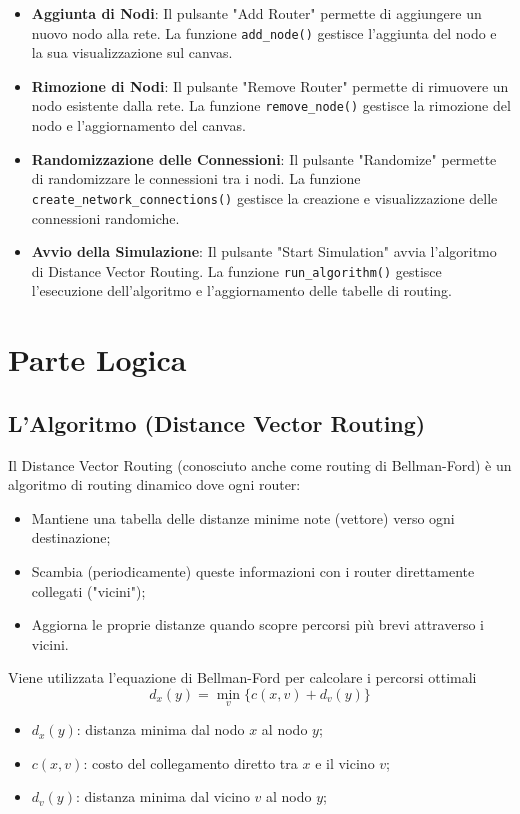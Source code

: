 \documentclass[a4paper,12pt]{report}
\begin{document}
\begin{itemize}
    \item \textbf{Aggiunta di Nodi}: Il pulsante "Add Router" permette di aggiungere un nuovo nodo alla rete. La funzione \texttt{add\_node()} gestisce l'aggiunta del nodo e la sua visualizzazione sul canvas.
    \item \textbf{Rimozione di Nodi}: Il pulsante "Remove Router" permette di rimuovere un nodo esistente dalla rete. La funzione \texttt{remove\_node()} gestisce la rimozione del nodo e l'aggiornamento del canvas.
    \item \textbf{Randomizzazione delle Connessioni}: Il pulsante "Randomize" permette di randomizzare le connessioni tra i nodi. \newline
    La funzione \texttt{create\_network\_connections()} gestisce la creazione e visualizzazione delle connessioni randomiche.
    \item \textbf{Avvio della Simulazione}: Il pulsante "Start Simulation" avvia l'algoritmo di Distance Vector Routing. \newline
    La funzione \texttt{run\_algorithm()} gestisce l'esecuzione dell'algoritmo e l'aggiornamento delle tabelle di routing.
\end{itemize}

\newpage
\section{Parte Logica}
\subsection{L'Algoritmo (Distance Vector Routing)}
Il Distance Vector Routing (conosciuto anche come routing di Bellman-Ford) è un algoritmo di routing dinamico dove ogni router:
\begin{itemize}
    \item Mantiene una tabella delle distanze minime note (vettore) verso ogni destinazione;
    \item Scambia (periodicamente) queste informazioni con i router direttamente collegati ("vicini");
    \item Aggiorna le proprie distanze quando scopre percorsi più brevi attraverso i vicini.
\end{itemize}

\noindent Viene utilizzata l'equazione di Bellman-Ford per calcolare i percorsi ottimali
\[ d_x(y) = \min_v\{c(x,v) + d_v(y)\} \]
\begin{itemize}
    \item $d_x(y)$: distanza minima dal nodo $x$ al nodo $y$;
    \item $c(x,v)$: costo del collegamento diretto tra $x$ e il vicino $v$;
    \item $d_v(y)$: distanza minima dal vicino $v$ al nodo $y$;
\end{itemize}
\end{document}
